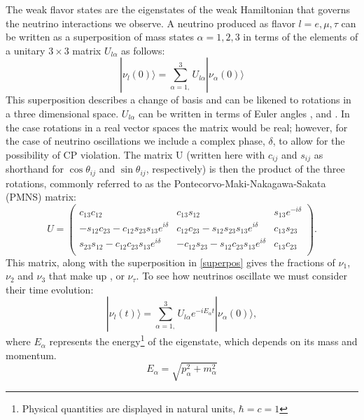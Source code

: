 The weak flavor states are the eigenstates of the weak Hamiltonian that governs the neutrino interactions we observe.  A neutrino produced as flavor $l = e, \mu, \tau$ can be written as a superposition of mass states $\alpha = 1, 2, 3$ in terms of the elements of a unitary $3\times3$ matrix $U_{l\alpha}$ as follows:
\begin{equation}\label{superpos}
|\nu_l(0) \rangle = \sum_{\alpha = 1,}^3 U_{l\alpha}|\nu_\alpha(0) \rangle
\end{equation} %
This superposition describes a change of basis and can be likened to rotations in a three dimensional space.   $U_{l\alpha}$ can be written in terms of Euler angles \thetaot, \thetatth and \thetaoth.  In the case rotations in a real vector spaces the matrix would be real; however, for the case of neutrino oscillations we include a complex phase, $\delta$, to allow for the possibility of CP violation.  The matrix U (written here with $c_{ij}$ and $s_{ij}$ as shorthand for $\cos{\theta_{ij}}$ and $\sin{\theta_{ij}}$, respectively) is then the product of the three rotations, commonly referred to as the Pontecorvo-Maki-Nakagawa-Sakata (PMNS) matrix:
\begin{equation}
 U = \begin{pmatrix} \label{pmns} 
c_{13}c_{12}              &    c_{13}s_{12}        &    s_{13} e^{-i\delta} \\
-s_{12}c_{23} - c_{12}s_{23}s_{13}e^{i\delta} & c_{12}c_{23} - s_{12}s_{23}s_{13}e^{i\delta}        &     c_{13}s_{23}  \\
s_{23}s_{12} - c_{12}c_{23}s_{13}e^{i\delta}  & -c_{12}s_{23} - s_{12}c_{23}s_{13}e^{i\delta}         &     c_{13}c_{23}  \\
\end{pmatrix}.
\end{equation}
This matrix, along with the superposition in \eqref{superpos} gives the fractions of $\nu_1$, $\nu_2$ and $\nu_3$ that make up \nue, \numu or $\nu_\tau$.  To see how neutrinos oscillate we must consider their time evolution:
\begin{equation}\label{evolve}
|\nu_l(t) \rangle = \sum_{\alpha = 1,}^3 U_{l\alpha}e^{-iE_\alpha t}|\nu_\alpha(0) \rangle, 
\end{equation}
where $E_\alpha$ represents the energy\footnote{Physical quantities are displayed in natural units, $\hbar = c = 1$}
of the eigenstate, which depends on its mass and momentum.
\begin{equation}\label{energy}
E_\alpha = \sqrt{p_\alpha^2 + m_\alpha^2} 
\end{equation}
